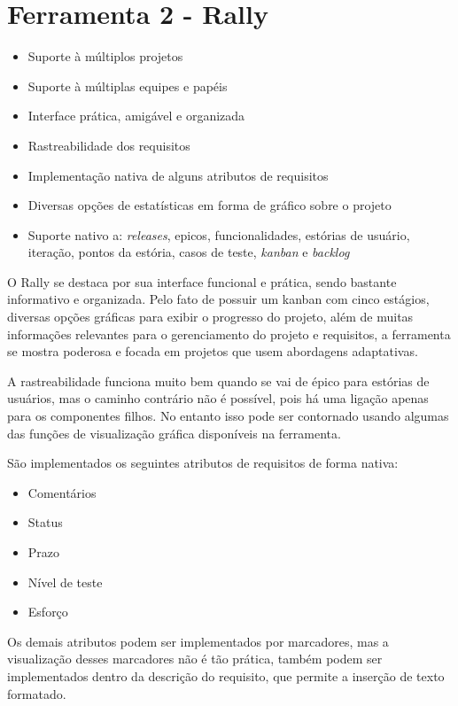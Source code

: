 \section{Ferramenta 2 - Rally}
\begin{itemize}
  \item Suporte à múltiplos projetos
  \item Suporte à múltiplas equipes e papéis
  \item Interface prática, amigável e organizada
  \item Rastreabilidade dos requisitos
  \item Implementação nativa de alguns atributos de requisitos
  \item Diversas opções de estatísticas em forma de gráfico sobre o projeto
  \item Suporte nativo a: \emph{releases}, epicos, funcionalidades, estórias de usuário, iteração, pontos da estória, casos de teste, \emph{kanban} e \emph{backlog}
\end{itemize}

O Rally se destaca por sua interface funcional e prática, sendo bastante informativo e organizada. Pelo fato de possuir um kanban com cinco estágios, diversas opções gráficas para exibir o progresso do projeto, além de muitas informações relevantes para o gerenciamento do projeto e requisitos, a ferramenta se mostra poderosa e focada em projetos que usem abordagens adaptativas.

A rastreabilidade funciona muito bem quando se vai de épico  para estórias de usuários, mas o caminho contrário não é possível, pois há uma ligação apenas para os componentes filhos. No entanto isso pode ser contornado usando algumas das funções de visualização gráfica disponíveis na ferramenta.

São implementados os seguintes atributos de requisitos de forma nativa:

\begin{itemize}
  \item Comentários
  \item Status
  \item Prazo
  \item Nível de teste
  \item Esforço
\end{itemize}

Os demais atributos podem ser implementados por marcadores, mas a visualização desses marcadores não é tão prática, também podem ser implementados dentro da descrição do requisito, que permite a inserção de texto formatado.

